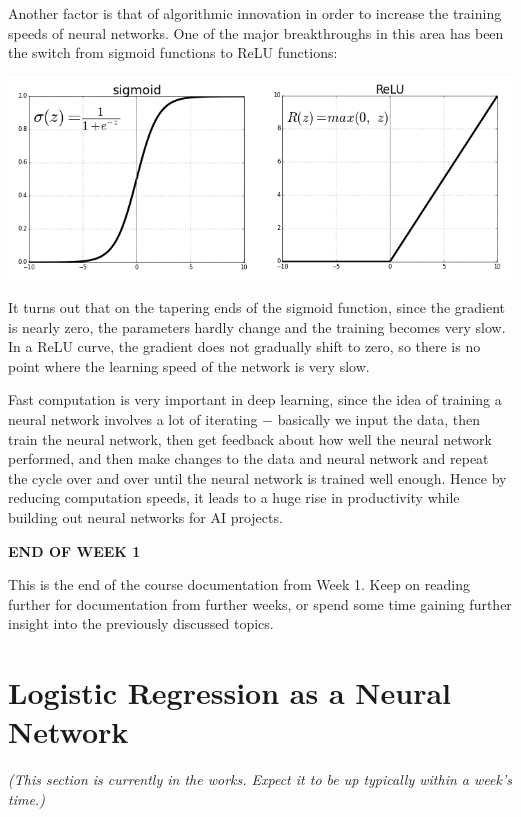 \documentclass{article}[a4paper,12pt]
\theoremstyle{definition}
\begin{document}
Another factor is that of algorithmic innovation in order to increase the training speeds of neural networks. One of the major breakthroughs in this area has been the switch from sigmoid functions to ReLU functions:
\begin{center}\includegraphics[scale=0.5]{sigmoid_relu.png}\end{center}
It turns out that on the tapering ends of the sigmoid function, since the gradient is nearly zero, the parameters hardly change and the training becomes very slow. In a ReLU curve, the gradient does not gradually shift to zero, so there is no point where the learning speed of the network is very slow. 
\vspace{6pt}

Fast computation is very important in deep learning, since the idea of training a neural network involves a lot of iterating $-$ basically we input the data, then train the neural network, then get feedback about how well the neural network performed, and then make changes to the data and neural network and repeat the cycle over and over until the neural network is trained well enough. Hence by reducing computation speeds, it leads to a huge rise in productivity while building out neural networks for AI projects.

\hrulefill
\begin{center}\textbf{END OF WEEK 1}\end{center}
This is the end of the course documentation from Week 1. Keep on reading further for documentation from further weeks, or spend some time gaining further insight into the previously discussed topics.

\hrulefill
\pagebreak
\section{Logistic Regression as a Neural Network}
\textit{(This section is currently in the works. Expect it to be up typically within a week's time.)}

\hrulefill
\end{document}
